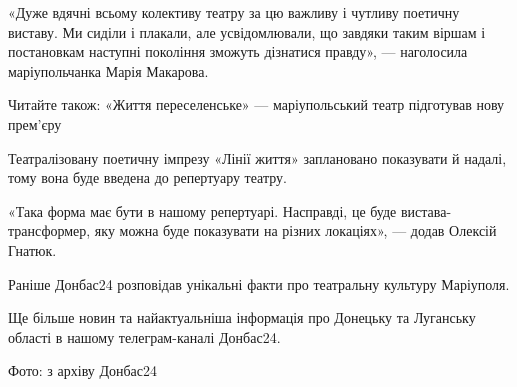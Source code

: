 «Дуже вдячні всьому колективу театру за цю важливу і чутливу поетичну виставу.
Ми сиділи і плакали, але усвідомлювали, що завдяки таким віршам і постановкам
наступні покоління зможуть дізнатися правду», — наголосила маріупольчанка Марія
Макарова.

Читайте також: «Життя переселенське» — маріупольський театр підготував нову
прем'єру

Театралізовану поетичну імпрезу «Лінії життя» заплановано показувати й надалі,
тому вона буде введена до репертуару театру.

«Така форма має бути в нашому репертуарі. Насправді, це буде
вистава-трансформер, яку можна буде показувати на різних локаціях», — додав
Олексій Гнатюк. 

Раніше Донбас24 розповідав унікальні факти про театральну культуру Маріуполя.

Ще більше новин та найактуальніша інформація про Донецьку та Луганську області
в нашому телеграм-каналі Донбас24.

Фото: з архіву Донбас24
